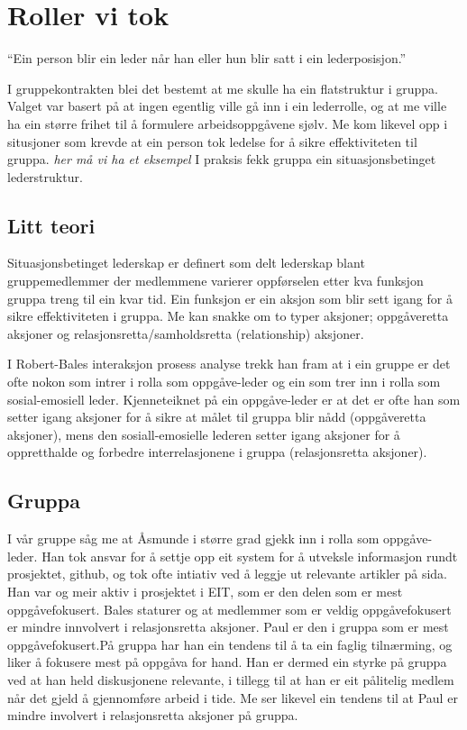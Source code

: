 \section{Roller vi tok}
``Ein person blir ein leder når han eller hun blir satt i ein lederposisjon.''


I gruppekontrakten blei det bestemt at me skulle ha ein flatstruktur i gruppa. Valget var basert på at ingen egentlig ville gå inn i ein lederrolle, og at me ville ha ein større frihet til å formulere arbeidsoppgåvene sjølv. Me kom likevel opp i situsjoner som krevde at ein person tok ledelse for å sikre effektiviteten til gruppa. 
\emph{her må vi ha et eksempel} I praksis fekk gruppa ein situasjonsbetinget lederstruktur.

\subsection{Litt teori}
Situasjonsbetinget lederskap er definert som delt lederskap blant gruppemedlemmer der medlemmene varierer oppførselen etter kva funksjon gruppa treng til ein kvar tid. Ein funksjon er ein aksjon som blir sett igang for å sikre effektiviteten i gruppa. Me kan snakke om to typer aksjoner; oppgåveretta aksjoner og relasjonsretta/samholdsretta (relationship) aksjoner. 

I Robert-Bales interaksjon prosess analyse trekk han fram at i ein gruppe er det ofte nokon som intrer i rolla som oppgåve-leder og ein som trer inn i rolla som sosial-emosiell leder. Kjenneteiknet på ein oppgåve-leder er at det er ofte han som setter igang aksjoner for å sikre at målet til gruppa blir nådd (oppgåveretta aksjoner), mens den sosiall-emosielle lederen setter igang aksjoner for å oppretthalde og forbedre interrelasjonene i gruppa (relasjonsretta aksjoner).

\subsection{Gruppa}
I vår gruppe såg me at Åsmunde i større grad gjekk inn i rolla som oppgåve-leder. Han tok ansvar for å settje opp eit system for å utveksle informasjon rundt prosjektet, github, og tok ofte intiativ ved å leggje ut relevante artikler på sida. Han var og meir aktiv i prosjektet i EIT, som er den delen som er mest oppgåvefokusert. 
Bales staturer og at medlemmer som er veldig oppgåvefokusert er mindre innvolvert i relasjonsretta aksjoner. Paul er den i gruppa som er mest oppgåvefokusert.På gruppa har han ein tendens til å ta ein faglig tilnærming, og liker å fokusere mest på oppgåva for hand. Han er dermed ein styrke på gruppa ved at han held diskusjonene relevante, i tillegg til at han er eit pålitelig medlem når det gjeld å gjennomføre arbeid i tide. Me ser likevel ein tendens til at Paul er mindre involvert i relasjonsretta aksjoner på gruppa. 

